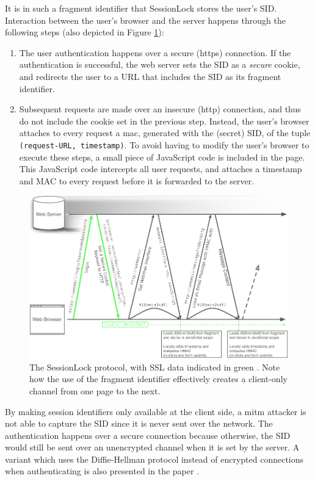 It is in such a fragment identifier that SessionLock stores the user's SID. Interaction between the user's browser and the server happens through the following steps (also depicted in Figure \ref{fig:sessionlock}):
\begin{enumerate}
	\item The user authentication happens over a secure (\gls{https}) connection. If the authentication is successful, the web server sets the SID as a \emph{secure} cookie, and redirects the user to a URL that includes the SID as its fragment identifier.
	\item Subsequent requests are made over an insecure (\gls{http}) connection, and thus do not include the cookie set in the previous step. Instead, the user's browser attaches to every request a \gls{mac}, generated with the (secret) SID, of the tuple \texttt{(request-URL, timestamp)}. To avoid having to modify the user's browser to execute these steps, a small piece of JavaScript code is included in the page. This JavaScript code intercepts all user requests, and attaches a timestamp and MAC to every request before it is forwarded to the server.
\end{enumerate}

\begin{figure}[htb]
	\centering
	\includegraphics[width=\textwidth]{img/sessionlock.png}
	\caption[The SessionLock protocol]{The SessionLock protocol, with SSL data indicated in green \cite{Adida2008}. Note how the use of the fragment identifier effectively creates a client-only channel from one page to the next.}
	\label{fig:sessionlock}
\end{figure}

By making session identifiers only available at the client side, a \gls{mitm} attacker is not able to capture the SID since it is never sent over the network. The authentication happens over a secure connection because otherwise, the SID would still be sent over an unencrypted channel when it is set by the server. A variant which uses the Diffie-Hellman protocol \cite{Diffie1976} instead of encrypted connections when authenticating is also presented in the paper \cite{Adida2008}.

